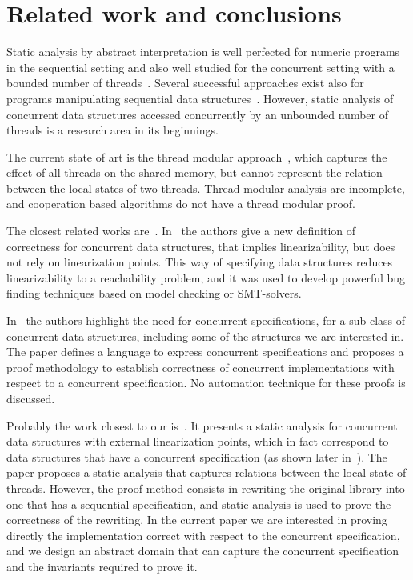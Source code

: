 \section{Related work and conclusions}
\label{sec:relwork}

Static analysis by abstract interpretation is well perfected for numeric programs in the sequential setting and also well studied for the concurrent setting with a bounded number of threads~\cite{mine15,DBLP:journals/lisp/Mine06,DBLP:conf/popl/CousotH78}. 
Several successful approaches exist also for programs manipulating  sequential data structures~\cite{SagivRW02,LiBCR17,pldi11}. 
However, static analysis of concurrent data structures accessed concurrently by an unbounded number of threads is a research area in its beginnings. 

The current state of art is the thread modular approach~\cite{threadmodular,Vafeiadis09,vv1}, which  captures the effect of all threads on the shared memory, but cannot represent the relation between the local states of two threads.  Thread modular analysis are incomplete, and cooperation based algorithms do not have a thread modular proof. 

The closest related works are~\cite{cav13,ee1,ee2,ee3,disc15}. 
In~\cite{ee1,ee2,ee3} the authors give a new definition of correctness for concurrent data structures, that implies linearizability, but does not rely on linearization points.  This way of specifying data structures  reduces linearizability to a reachability problem, and it was used to develop powerful bug finding techniques based on model checking or SMT-solvers. 

In~\cite{disc15} the authors highlight the need for concurrent specifications, for a sub-class of concurrent data structures, including some of the structures we are interested in. The paper defines a language to express concurrent specifications and proposes a proof methodology to establish correctness of concurrent implementations with respect to a concurrent specification.  No automation technique for these proofs is discussed.  

Probably the work closest to our is~\cite{cav13}. It presents a static analysis for concurrent data structures with external linearization points, which in fact correspond to data structures that have a concurrent specification (as shown later in~\cite{disc15}).  
The paper proposes a static analysis that captures relations between the local state of threads.  
However, the proof method consists in rewriting the original library into one that has a sequential specification, and static analysis is used to prove the correctness of the rewriting. In the current paper we are interested in proving directly the implementation correct with respect to the concurrent specification, and we design an abstract domain that can capture the concurrent specification and the invariants required to prove it. 


